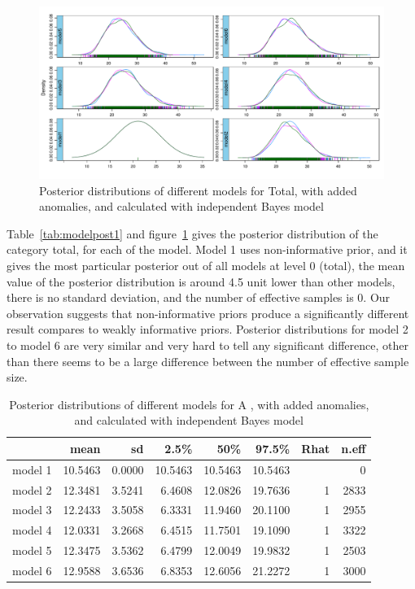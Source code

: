 \begin{figure}[!h]
	\centering
	\includegraphics[width=1\linewidth]{../../R-codes/JAGS/plots/findmodel/Densitytotal3abn}
	\caption{Posterior distributions of different models for Total, with added anomalies, and calculated with independent Bayes model}
	\label{fig:densitytotal3abn}
\end{figure}

Table~\ref{tab:modelpost1} and figure~\ref{fig:densitytotal3abn} gives the posterior distribution of the category total, for each of the model. Model 1 uses non-informative prior, and it gives the most particular posterior out of all models at level 0 (total), the mean value of the posterior distribution is around 4.5 unit lower than other models, there is no standard deviation, and the number of effective samples is 0. Our observation suggests that non-informative priors produce a significantly different result compares to weakly informative priors. Posterior distributions for model 2 to model 6 are very similar and very hard to tell any significant difference, other than there seems to be a large difference between the number of effective sample size.

\newpage %
\begin{table}[!ht]
	\centering
	\begin{tabular}{rrrrrrrr}
		\hline
		& mean & sd & 2.5\% & 50\% & 97.5\% & Rhat & n.eff \\ 
		\hline
		model 1 & 10.5463 & 0.0000 & 10.5463 & 10.5463 & 10.5463 &  & 0 \\ 
		model 2 & 12.3481 & 3.5241 & 6.4608 & 12.0826 & 19.7636 & 1 & 2833 \\ 
		model 3 & 12.2433 & 3.5058 & 6.3331 & 11.9460 & 20.1100 & 1 & 2955 \\ 
		model 4 & 12.0331 & 3.2668 & 6.4515 & 11.7501 & 19.1090 & 1 & 3322 \\ 
		model 5 & 12.3475 & 3.5362 & 6.4799 & 12.0049 & 19.9832 & 1 & 2503 \\ 
		model 6 & 12.9588 & 3.6536 & 6.8353 & 12.6056 & 21.2272 & 1 & 3000 \\ 
		\hline
	\end{tabular}
	\caption{Posterior distributions of different models for A , with added anomalies, and calculated with independent Bayes model} 
	\label{tab:modelpost2}
\end{table}

